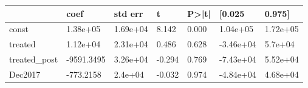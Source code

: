 \begin{tabular}{lllllll}
\toprule
 & coef & std err & t & P>|t| & [0.025 & 0.975] \\
\midrule
const &   1.38e+05 &  1.69e+04 &     8.142 &  0.000 &  1.04e+05 &  1.72e+05 \\
treated &   1.12e+04 &  2.31e+04 &     0.486 &  0.628 & -3.46e+04 &   5.7e+04 \\
treated_post & -9591.3495 &  3.26e+04 &    -0.294 &  0.769 & -7.43e+04 &  5.52e+04 \\
Dec2017 &  -773.2158 &   2.4e+04 &    -0.032 &  0.974 & -4.84e+04 &  4.68e+04 \\
\bottomrule
\end{tabular}
